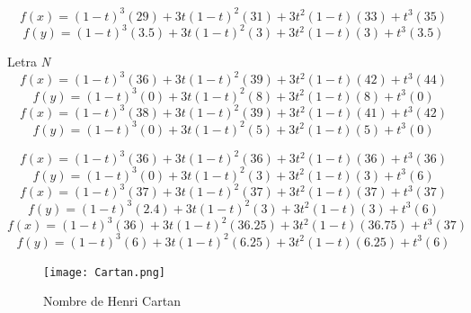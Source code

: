 \documentclass[11pt]{article}
\begin{document}
\begin{enumerate}
\begin{equation}
f(x) = (1-t)^{3}\left(29\right)+3t(1-t)^{2}\left(31\right)+3t^{2}(1-t)\left(33\right)+t^{3}\left(35\right)
\end{equation}
\begin{equation}
f(y) = (1-t)^{3}\left(3.5\right)+3t(1-t)^{2}\left(3\right)+3t^{2}(1-t)\left(3\right)+t^{3}\left(3.5\right)
\end{equation}

Letra \emph{N}
\begin{equation}
f(x) = (1-t)^{3}\left(36\right)+3t(1-t)^{2}\left(39\right)+3t^{2}(1-t)\left(42\right)+t^{3}\left(44\right)
\end{equation}
\begin{equation}
f(y) = (1-t)^{3}\left(0\right)+3t(1-t)^{2}\left(8\right)+3t^{2}(1-t)\left(8\right)+t^{3}\left(0\right)
\end{equation}
\begin{equation}
f(x) = (1-t)^{3}\left(38\right)+3t(1-t)^{2}\left(39\right)+3t^{2}(1-t)\left(41\right)+t^{3}\left(42\right)
\end{equation}
\begin{equation}
f(y) = (1-t)^{3}\left(0\right)+3t(1-t)^{2}\left(5\right)+3t^{2}(1-t)\left(5\right)+t^{3}\left(0\right)
\end{equation}

\begin{equation}
f(x) = (1-t)^{3}\left(36\right)+3t(1-t)^{2}\left(36\right)+3t^{2}(1-t)\left(36\right)+t^{3}\left(36\right)
\end{equation}
\begin{equation}
f(y) = (1-t)^{3}\left(0\right)+3t(1-t)^{2}\left(3\right)+3t^{2}(1-t)\left(3\right)+t^{3}\left(6\right)
\end{equation}
\begin{equation}
f(x) = (1-t)^{3}\left(37\right)+3t(1-t)^{2}\left(37\right)+3t^{2}(1-t)\left(37\right)+t^{3}\left(37\right)
\end{equation}
\begin{equation}
f(y) = (1-t)^{3}\left(2.4\right)+3t(1-t)^{2}\left(3\right)+3t^{2}(1-t)\left(3\right)+t^{3}\left(6\right)
\end{equation}
\begin{equation}
f(x) = (1-t)^{3}\left(36\right)+3t(1-t)^{2}\left(36.25\right)+3t^{2}(1-t)\left(36.75\right)+t^{3}\left(37\right)
\end{equation}
\begin{equation}
f(y) = (1-t)^{3}\left(6\right)+3t(1-t)^{2}\left(6.25\right)+3t^{2}(1-t)\left(6.25\right)+t^{3}\left(6\right)
\end{equation}

\begin{center}
	\begin{figure}[h!]
		\centering
		\texttt{[image: Cartan.png]}
		\caption{Nombre de Henri Cartan}
	\end{figure}
\end{center}

\end{enumerate}
\end{document}
